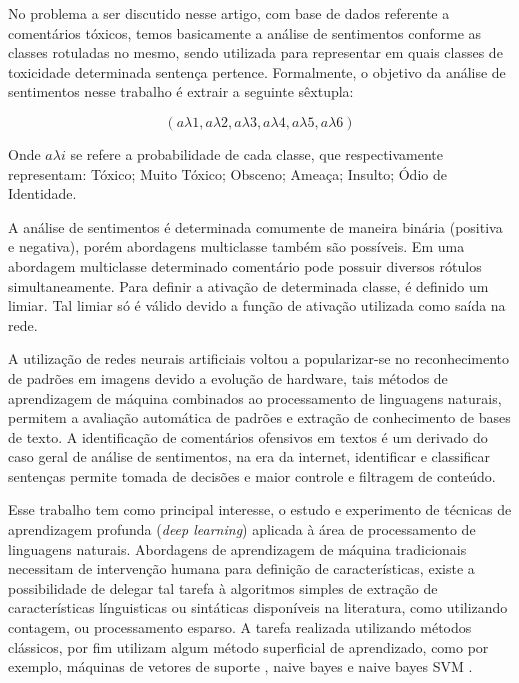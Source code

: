 \documentclass[12pt]{article}
\begin{document}
No problema a ser discutido nesse artigo, com base de dados referente a comentários tóxicos, temos basicamente a análise de sentimentos conforme as classes rotuladas no mesmo, sendo utilizada para representar em quais classes de toxicidade determinada sentença pertence. Formalmente, o objetivo da análise de sentimentos nesse trabalho é extrair a seguinte sêxtupla:

\[
(a\lambda1, a\lambda2, a\lambda3, a\lambda4, a\lambda5, a\lambda6)
\]

Onde $a \lambda i$ se refere a probabilidade de cada classe, que respectivamente representam: Tóxico; Muito Tóxico; Obsceno; Ameaça; Insulto; Ódio de Identidade.

A análise de sentimentos é determinada comumente de maneira binária (positiva e negativa), porém abordagens multiclasse também são possíveis. Em uma abordagem multiclasse determinado comentário pode possuir diversos rótulos simultaneamente. Para definir a ativação de determinada classe, é definido um limiar. Tal limiar só é válido devido a função de ativação utilizada como saída na rede.

A utilização de redes neurais artificiais voltou a popularizar-se no reconhecimento de padrões em imagens devido a evolução de hardware, tais métodos de aprendizagem de máquina combinados ao processamento de linguagens naturais, permitem a avaliação automática de padrões e extração de conhecimento de bases de texto. A identificação de comentários ofensivos em textos é um derivado do caso geral de análise de sentimentos, na era da internet, identificar e classificar sentenças permite tomada de decisões e maior controle e filtragem de conteúdo. 

Esse trabalho tem como principal interesse, o estudo e experimento de técnicas de aprendizagem profunda (\textit{deep learning}) aplicada à área de processamento de linguagens naturais. Abordagens de aprendizagem de máquina tradicionais necessitam de intervenção humana para definição de características, existe a possibilidade de delegar tal tarefa à algoritmos simples de extração de características línguisticas ou sintáticas disponíveis na literatura, como utilizando contagem, ou processamento esparso. A tarefa realizada utilizando métodos clássicos, por fim utilizam algum método superficial de aprendizado, como por exemplo, máquinas de vetores de suporte \cite{DBLP:journals/ml/CortesV95}, naive bayes e naive bayes SVM \cite{wang:2012}.
\end{document}
